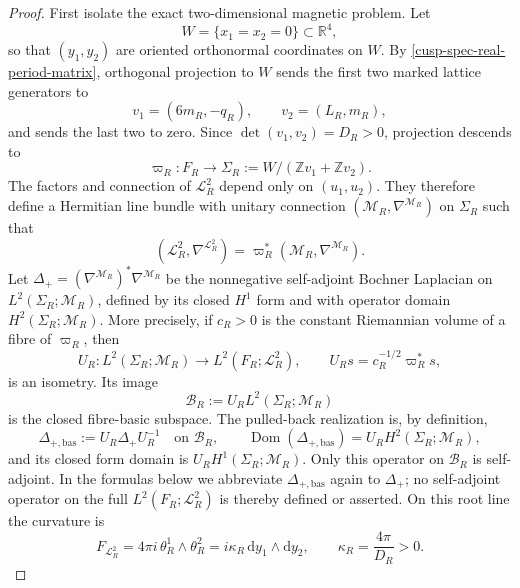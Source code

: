 \begin{proof}
First isolate the exact two-dimensional magnetic problem.  Let
\[
 W=\{x_1=x_2=0\}\subset\mathbb R^4,
\]
so that \((y_1,y_2)\) are oriented orthonormal coordinates on \(W\).
By \cref{cusp-spec-real-period-matrix}, orthogonal projection to \(W\)
sends the first two marked lattice generators to
\[
 v_1=(6m_R,-q_R),
 \qquad
 v_2=(L_R,m_R),
\]
and sends the last two to zero.  Since
\(\det(v_1,v_2)=D_R>0\), projection descends to
\[
 \varpi_R:F_R\longrightarrow
 \Sigma_R:=W/(\mathbb Zv_1+\mathbb Zv_2).
\]
The factors and connection of \(\mathscr L_R^2\) depend only on
\((u_1,u_2)\).  They therefore define a Hermitian line bundle with unitary
connection \((\mathscr M_R,\nabla^{\mathscr M_R})\) on \(\Sigma_R\) such
that
\begin{equation}
 (\mathscr L_R^2,\nabla^{\mathscr L_R^2})
 =\varpi_R^*(\mathscr M_R,\nabla^{\mathscr M_R}).
 \label{cusp-magnetic-descended-root-line}
\end{equation}
Let \(\Delta_+=(\nabla^{\mathscr M_R})^*\nabla^{\mathscr M_R}\) be the
nonnegative self-adjoint Bochner Laplacian on
\(L^2(\Sigma_R;\mathscr M_R)\), defined by its closed \(H^1\) form and
with operator domain \(H^2(\Sigma_R;\mathscr M_R)\).  More precisely, if
\(c_R>0\) is the constant Riemannian volume of a fibre of \(\varpi_R\),
then
\[
 U_R:L^2(\Sigma_R;\mathscr M_R)\longrightarrow
       L^2(F_R;\mathscr L_R^2),
 \qquad U_Rs=c_R^{-1/2}\varpi_R^*s,
\]
is an isometry.  Its image
\[
 \mathscr B_R:=U_RL^2(\Sigma_R;\mathscr M_R)
\]
is the closed fibre-basic subspace.  The pulled-back realization is,
by definition,
\[
 \Delta_{+,\mathrm{bas}}:=U_R\Delta_+U_R^{-1}
 \quad\text{on }\mathscr B_R,
 \qquad
 \operatorname{Dom}(\Delta_{+,\mathrm{bas}})
 =U_RH^2(\Sigma_R;\mathscr M_R),
\]
and its closed form domain is \(U_RH^1(\Sigma_R;\mathscr M_R)\).
Only this operator on \(\mathscr B_R\) is self-adjoint.  In the formulas
below we abbreviate \(\Delta_{+,\mathrm{bas}}\) again to \(\Delta_+\);
no self-adjoint operator on the full
\(L^2(F_R;\mathscr L_R^2)\) is thereby defined or asserted.  On this
root line the curvature is
\begin{equation}
 F_{\mathscr L_R^2}
 =4\pi i\,\theta_R^1\wedge\theta_R^2
 =i\kappa_R\,\mathrm dy_1\wedge\mathrm dy_2,
 \qquad
 \kappa_R=\frac{4\pi}{D_R}>0.
 \label{cusp-magnetic-root-field-strength}
\end{equation}


\end{proof}
